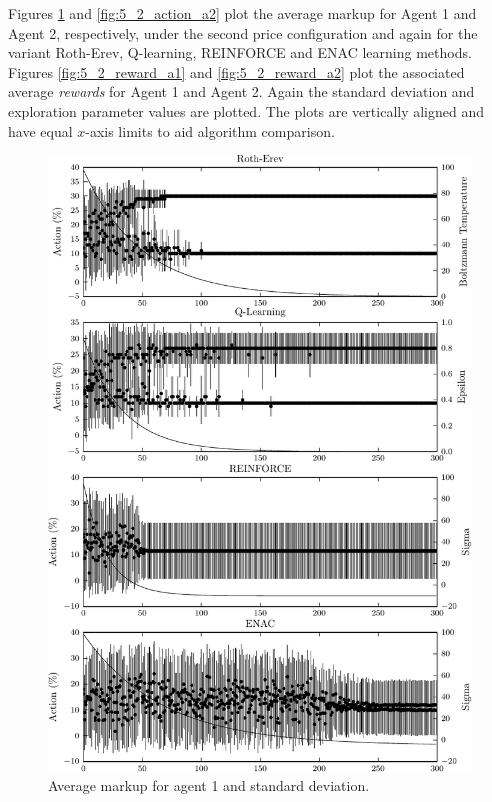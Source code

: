 Figures \ref{fig:5_2_action_a1} and \ref{fig:5_2_action_a2} plot the average
markup for Agent 1 and Agent 2, respectively, under the second price
configuration and again for the variant Roth-Erev, Q-learning, REINFORCE and
ENAC learning methods.  Figures \ref{fig:5_2_reward_a1} and
\ref{fig:5_2_reward_a2} plot the associated average \textit{rewards} for
Agent 1 and Agent 2.  Again the standard deviation and exploration parameter
values are plotted. The plots are vertically aligned and have equal $x$-axis
limits to aid algorithm comparison.
\begin{figure}
  \centering
  \includegraphics{figures/fig5_2_action_a1}
  \caption{Average markup for agent 1 and standard deviation.}
  \label{fig:5_2_action_a1}
\end{figure}
